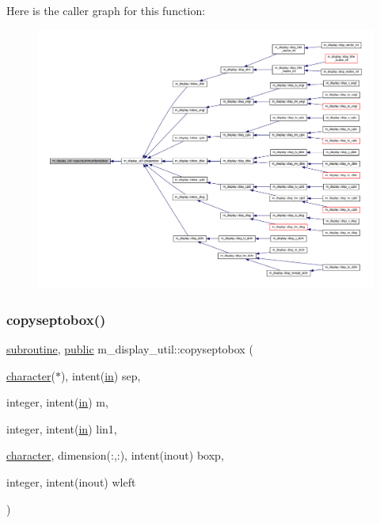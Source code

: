 Here is the caller graph for this function\+:
\nopagebreak
\begin{figure}[H]
\begin{center}
\leavevmode
\includegraphics[width=350pt]{namespacem__display__util_a43abab0fd2426042dc21b42e638210a8_icgraph}
\end{center}
\end{figure}
\mbox{\label{namespacem__display__util_ab8090500f628c3475b88b0068c6788a4}} 
\subsubsection{\texorpdfstring{copyseptobox()}{copyseptobox()}}
{\footnotesize\ttfamily \hyperlink{M__stopwatch_83_8txt_acfbcff50169d691ff02d4a123ed70482}{subroutine}, \hyperlink{M__stopwatch_83_8txt_a2f74811300c361e53b430611a7d1769f}{public} m\+\_\+display\+\_\+util\+::copyseptobox (\begin{DoxyParamCaption}\item[{\hyperlink{option__stopwatch_83_8txt_abd4b21fbbd175834027b5224bfe97e66}{character}($\ast$), intent(\hyperlink{M__journal_83_8txt_afce72651d1eed785a2132bee863b2f38}{in})}]{sep,  }\item[{integer, intent(\hyperlink{M__journal_83_8txt_afce72651d1eed785a2132bee863b2f38}{in})}]{m,  }\item[{integer, intent(\hyperlink{M__journal_83_8txt_afce72651d1eed785a2132bee863b2f38}{in})}]{lin1,  }\item[{\hyperlink{option__stopwatch_83_8txt_abd4b21fbbd175834027b5224bfe97e66}{character}, dimension(\+:,\+:), intent(inout)}]{boxp,  }\item[{integer, intent(inout)}]{wleft }\end{DoxyParamCaption})}

